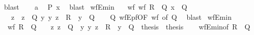 \begin{isabellebody}
\ blast\isanewline
\ \ \isamarkupfalse%
\ a\ \isamarkupfalse%
\ {\isachardoublequoteopen}P\ x{\isachardoublequoteclose}\ \isamarkupfalse%
\ blast\isanewline
{}\isamarkupfalse%
%
\endisatagproof
{\isafoldproof}%
%
\isadelimproof
%
\endisadelimproof
%
\isadelimdocument
%
\endisadelimdocument
%
\isatagdocument
%
\isamarkuptrue%
%
\endisatagdocument
{\isafolddocument}%
%
\isadelimdocument
%
\endisadelimdocument
{}\isamarkupfalse%
\ wfE{\isacharunderscore}{\kern0pt}min{\isacharcolon}{\kern0pt}\isanewline
\ \ \ wf{\isacharcolon}{\kern0pt}\ {\isachardoublequoteopen}wf\ R{\isachardoublequoteclose}\ \ Q{\isacharcolon}{\kern0pt}\ {\isachardoublequoteopen}x\ {\isasymin}\ Q{\isachardoublequoteclose}\isanewline
\ \ \ z\ \ {\isachardoublequoteopen}z\ {\isasymin}\ Q{\isachardoublequoteclose}\ {\isachardoublequoteopen}{\isasymAnd}y{\isachardot}{\kern0pt}\ {\isacharparenleft}{\kern0pt}y{\isacharcomma}{\kern0pt}\ z{\isacharparenright}{\kern0pt}\ {\isasymin}\ R\ {\isasymLongrightarrow}\ y\ {\isasymnotin}\ Q{\isachardoublequoteclose}\isanewline
%
\isadelimproof
\ \ %
\endisadelimproof
%
\isatagproof
{}\isamarkupfalse%
\ Q\ wfE{\isacharunderscore}{\kern0pt}pf{\isacharbrackleft}{\kern0pt}OF\ wf{\isacharcomma}{\kern0pt}\ of\ Q{\isacharbrackright}{\kern0pt}\ \isamarkupfalse%
\ blast%
\endisatagproof
{\isafoldproof}%
%
\isadelimproof
\isanewline
%
\endisadelimproof
\isanewline
{}\isamarkupfalse%
\ wfE{\isacharunderscore}{\kern0pt}min{\isacharprime}{\kern0pt}{\isacharcolon}{\kern0pt}\isanewline
\ \ {\isachardoublequoteopen}wf\ R\ {\isasymLongrightarrow}\ Q\ {\isasymnoteq}\ {\isacharbraceleft}{\kern0pt}{\isacharbraceright}{\kern0pt}\ {\isasymLongrightarrow}\ {\isacharparenleft}{\kern0pt}{\isasymAnd}z{\isachardot}{\kern0pt}\ z\ {\isasymin}\ Q\ {\isasymLongrightarrow}\ {\isacharparenleft}{\kern0pt}{\isasymAnd}y{\isachardot}{\kern0pt}\ {\isacharparenleft}{\kern0pt}y{\isacharcomma}{\kern0pt}\ z{\isacharparenright}{\kern0pt}\ {\isasymin}\ R\ {\isasymLongrightarrow}\ y\ {\isasymnotin}\ Q{\isacharparenright}{\kern0pt}\ {\isasymLongrightarrow}\ thesis{\isacharparenright}{\kern0pt}\ {\isasymLongrightarrow}\ thesis{\isachardoublequoteclose}\isanewline
%
\isadelimproof
\ \ %
\endisadelimproof
%
\isatagproof
{}\isamarkupfalse%
\ wfE{\isacharunderscore}{\kern0pt}min{\isacharbrackleft}{\kern0pt}of\ R\ {\isacharunderscore}{\kern0pt}\ Q{\isacharbrackright}{\kern0pt}\ \isamarkupfalse%

\end{isabellebody}
